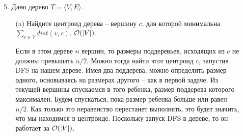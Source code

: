 \begin{enumerate}
\begin{solution}
    \end{solution}
    \item[5.] Дано дерево $T=\langle V, E\rangle$.
    \begin{enumerate}
        \item[(a)] Найдите центроид дерева -- вершину $c$, для которой минимальна $\sum_{v\in V}dist(v,c)$. $\mathcal{O}(|V|)$.
        \begin{solution}
            Если в этом дереве $n$ вершин, то размеры поддеревьев, исходящих из $c$ не должны превышать $n/2$. Можно тогда найти этот центроид $c$, запустив DFS на нашем дереве. Имея два поддерева, можно определить размер одного, основываясь на размерах другого -- как в первой задаче. Из текущей вершины спускаемся в того ребенка, размер поддерева которого максимален. Будем спускаться, пока размер ребенка больше или равен $n/2$. Как только это неравенство перестанет выполнять, это будет значить, что мы находимся в центроиде. Поскольку запуск DFS в дереве, то он работает за $\mathcal{O}(|V|)$.
        \end{solution}
    \end{enumerate}
\end{enumerate}
